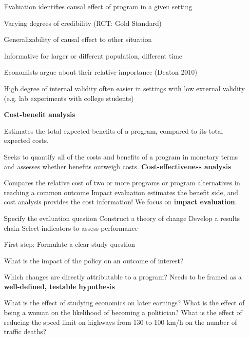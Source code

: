 \documentclass[
  25pt,         %
  a4paper,
  landscape,
  Screen4to3,
  footrule ]{foils}
\renewcommand{\pause}{}
\newcommand{\xx}{\item[{\small $\bullet$}]}
\begin{document}
\bi 
{}
\bi 
\xx Evaluation identifies causal effect of program in a given setting
\xx Varying degrees of credibility (RCT: Gold Standard)
\ei
{} 
\bi 
\xx Generalizability of causal effect to other situation
\xx Informative for larger or different population, different time
\ei
\pause
\x Economists argue about their relative importance (Deaton 2010)
\bi 
\xx High degree of internal validity often easier in settings with low external validity (e.g. lab experiments with college students)
\ei
\ei

\bi
\x \textbf{Cost-benefit analysis}
\bi
\xx Estimates the total expected benefits of a program, compared to its total
expected costs. 
\xx Seeks to quantify all of the costs and benefits of a program
in monetary terms and assesses whether benefits outweigh costs.
\ei
\x \textbf{Cost-effectiveness analysis}
\bi
\xx Compares the relative cost of two or more programs
or program alternatives in reaching a common outcome
\ei
\ei
Impact evaluation estimates the benefit side, and cost analysis provides
the cost information! We focus on \textbf{impact evaluation}.




\bi
\x Specify the evaluation question
\x Construct a theory of change
\x Develop a results chain
\x Select indicators to assess performance
\ei


\bi 
\x First step: Formulate a clear study question
\bi 
\xx What is the impact of the policy on an outcome of interest?
\xx Which changes are directly attributable to a program?
\ei
\x Needs to be framed as a \textbf{well-defined, testable hypothesis}
\ei


\bi
\x What is the effect of studying economics on later earnings?
\x What is the effect of being a woman on the likelihood of becoming a politician?
\x What is the effect of reducing the speed limit on highways from 130 to 100 km/h on the number of traffic deaths?
\ei
\end{document}
